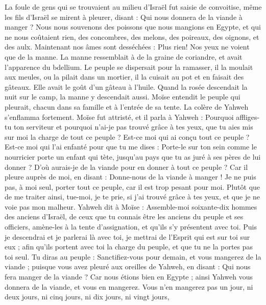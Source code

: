 \begin{multicols}{2}
La foule de gens qui se trouvaient au milieu d’Israël fut saisie de convoitise, même les fils d'Israël se mirent à pleurer, disant : Qui nous donnera de la viande à manger ?
Nous nous souvenons des poissons que nous mangions en Egypte, et qui ne nous coûtaient rien, des concombres, des melons, des poireaux, des oignons, et des aulx.
Maintenant nos âmes sont desséchées : Plus rien! Nos yeux ne voient que de la manne.
La manne ressemblait à de la graine de coriandre, et avait l’apparence du bdellium.
Le peuple se dispersait pour la ramasser, il la moulait aux meules, ou la pilait dans un mortier, il la cuisait au pot et en faisait des gâteaux. Elle avait le goût d'un gâteau à l'huile.
Quand la rosée descendait la nuit sur le camp, la manne y descendait aussi.
Moïse entendit le peuple qui pleurait, chacun dans sa famille et à l'entrée de sa tente. La colère de Yahweh s’enflamma fortement. Moïse fut attristé,
et il parla à Yahweh : Pourquoi affliges-tu ton serviteur et pourquoi n'ai-je pas trouvé grâce à tes yeux, que tu aies mis sur moi la charge de tout ce peuple ?
Est-ce moi qui ai conçu tout ce peuple ? Est-ce moi qui l’ai enfanté pour que tu me dises : Porte-le sur ton sein comme le nourricier porte un enfant qui tète, jusqu'au pays que tu as juré à ses pères de lui donner ?
D'où aurais-je de la viande pour en donner à tout ce peuple ? Car il pleure auprès de moi, en disant : Donne-nous de la viande à manger !
Je ne puis pas, à moi seul, porter tout ce peuple, car il est trop pesant pour moi.
Plutôt que de me traiter ainsi, tue-moi, je te prie, si j'ai trouvé grâce à tes yeux, et que je ne voie pas mon malheur.
Yahweh dit à Moïse : Assemble-moi soixante-dix hommes des anciens d'Israël, de ceux que tu connais être les anciens du peuple et ses officiers, amène-les à la tente d'assignation, et qu'ils s’y présentent avec toi.
Puis je descendrai et je parlerai là avec toi, je mettrai de l'Esprit qui est sur toi sur eux ; afin qu'ils portent avec toi la charge du peuple, et que tu ne la portes pas toi seul.
Tu diras au peuple : Sanctifiez-vous pour demain, et vous mangerez de la viande ; puisque vous avez pleuré aux oreilles de Yahweh, en disant : Qui nous fera manger de la viande ? Car nous étions bien en Egypte ; ainsi Yahweh vous donnera de la viande, et vous en mangerez.
Vous n'en mangerez pas un jour, ni deux jours, ni cinq jours, ni dix jours, ni vingt jours,

\end{multicols}
